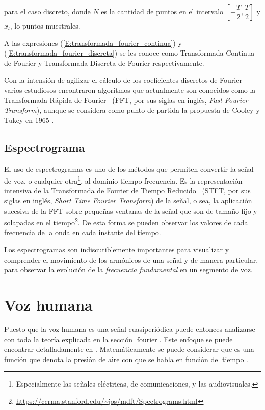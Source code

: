 para el caso discreto, donde $N$ es la cantidad de puntos en el intervalo $[-\dfrac{T}{2}, \dfrac{T}{2}]$ y $x_l$, lo puntos muestrales. 

A las expresiones (\ref{E:transformada_fourier_continua}) y (\ref{E:transformada_fourier_discreta}) se les conoce como Transformada Continua de Fourier y Transformada Discreta de Fourier respectivamente.


Con la intensi\'on de agilizar el c\'alculo de los coeficientes discretos de Fourier varios estudiosos encontraron algoritmos que actualmente son conocidos como la Transformada R\'apida de Fourier ~(FFT, por sus siglas en ingl\'es, \emph{Fast Fourier Transform}), aunque se considera como punto de partida la propuesta de Cooley y Tukey en 1965 \cite{gautschinumerical}.


\subsection{Espectrograma} \label{espectrograma}
El uso de espectrogramas es uno de los m\'etodos que permiten convertir la se\~nal de voz, o cualquier otra\footnote{ Especialmente las se\~nales el\'ectricas, de comunicaciones, y las audiovisuales.}, al dominio tiempo-frecuencia. Es la representaci\'on intensiva de la Transformada de Fourier de Tiempo Reducido ~(STFT, por sus siglas en ingl\'es, \emph{Short Time Fourier Transform})\cite{flandrin2015time} de la se\~nal, o sea, la aplicaci\'on sucesiva de la FFT  sobre peque\~nas ventanas de la se\~nal que son de tama\~no fijo y solapadas en el tiempo\footnote{\url{https://ccrma.stanford.edu/~jos/mdft/Spectrograms.html}}. De esta forma se pueden observar los valores de cada frecuencia de la onda en cada instante del tiempo.


Los espectrogramas son indiscutiblemente importantes para visualizar y comprender el movimiento de los arm\'onicos de una se\~nal y de manera particular, para observar la evoluci\'on de la \emph{frecuencia fundamental} en un segmento de voz.

\section{Voz humana}
Puesto que la voz humana es una se\~nal cuasiperi\'odica \cite{droguett2017aplicaciones, schroeder2013computer} puede entonces analizarse con toda la teor\'ia explicada en la secci\'on \ref{fourier}. Este enfoque se puede encontrar detalladamente en \cite[secci\'on 7.5]{schroeder2013computer}. Matem\'aticamente se puede considerar que es una funci\'on que  denota la presi\'on de aire con que se habla en funci\'on del tiempo \cite{schroeder2013computer}.


